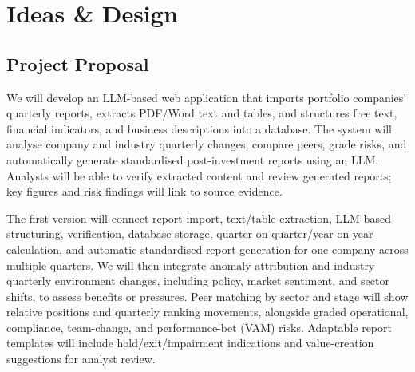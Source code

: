 \documentclass[a4paper,12pt]{article}
\begin{document}
\newpage

\section{Ideas \& Design}
\subsection{Project Proposal}
We will develop an LLM-based web application that imports portfolio companies'
quarterly reports, extracts PDF/Word text and tables, and structures free
text, financial indicators, and business descriptions into a database.
The system will analyse company and industry quarterly changes, compare
peers, grade risks, and automatically generate standardised post-investment
reports using an LLM. Analysts will be able to verify extracted content
and review generated reports; key figures and risk findings will link to
source evidence.

The first version will connect report import, text/table extraction,
LLM-based structuring, verification, database storage,
quarter-on-quarter/year-on-year calculation, and automatic standardised
report generation for one company across multiple quarters. We will then
integrate anomaly attribution and industry quarterly environment changes,
including policy, market sentiment, and sector shifts, to assess benefits
or pressures. Peer matching by sector and stage will show relative
positions and quarterly ranking movements, alongside graded operational, compliance,
team-change, and performance-bet (VAM) risks. Adaptable report templates
will include hold/exit/impairment indications and value-creation suggestions
for analyst review.
\end{document}
